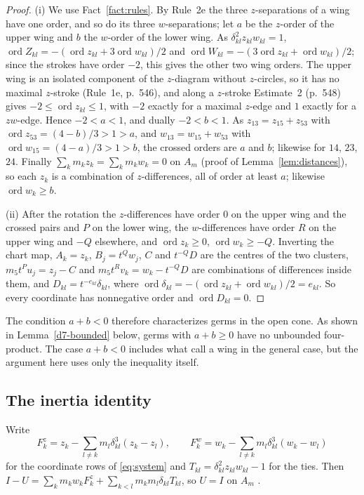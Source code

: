 \documentclass[11pt]{amsart}
\theoremstyle{definition}
\theoremstyle{remark}
\newcommand{\ord}{\operatorname{ord}}
\begin{document}
\begin{proof}
(i) We use Fact~\ref{fact:rules}.  By Rule~2e \cite[p.~552]{AK} the three $z$-separations of a
wing have one order, and so do its three $w$-separations; let $a$ be the $z$-order of the upper
wing and $b$ the $w$-order of the lower wing.  As $\delta_{kl}^2z_{kl}w_{kl}=1$,
$\ord Z_{kl}=-(\ord z_{kl}+3\ord w_{kl})/2$ and $\ord W_{kl}=-(3\ord z_{kl}+\ord w_{kl})/2$;
since the strokes have order $-2$, this gives the other two wing orders.  The upper wing is an
isolated component of the $z$-diagram without $z$-circles, so it has no maximal $z$-stroke
(Rule~1e, p.~546), and along a $z$-stroke Estimate~2 (p.~548) gives $-2\le\ord z_{kl}\le1$, with
$-2$ exactly for a maximal $z$-edge and $1$ exactly for a $zw$-edge.  Hence $-2<a<1$, and dually
$-2<b<1$.  As $z_{13}=z_{15}+z_{53}$
with $\ord z_{53}=(4-b)/3>1>a$, and $w_{13}=w_{15}+w_{53}$ with $\ord w_{15}=(4-a)/3>1>b$, the
crossed orders are $a$ and $b$; likewise for $14$, $23$, $24$.  Finally
$\sum_km_kz_k=\sum_km_kw_k=0$ on $A_m$ (proof of Lemma~\ref{lem:distances}), so each $z_k$ is a
combination of $z$-differences, all of order at least $a$; likewise $\ord w_k\ge b$.

(ii) After the rotation the $z$-differences have order $0$ on the upper wing and the crossed
pairs and $P$ on the lower wing, the $w$-differences have order $R$ on the upper wing and $-Q$
elsewhere, and $\ord z_k\ge0$, $\ord w_k\ge-Q$.  Inverting the chart map, $A_k=z_k$,
$B_j=t^Qw_j$, $C$ and $t^{-Q}D$ are the centres of the two clusters, $m_5t^Pu_j=z_j-C$ and
$m_5t^Rv_k=w_k-t^{-Q}D$ are combinations of differences inside them, and
$D_{kl}=t^{-e_{kl}}\delta_{kl}$, where $\ord\delta_{kl}=-(\ord z_{kl}+\ord w_{kl})/2=e_{kl}$.  So
every coordinate has nonnegative order and $\ord D_{kl}=0$.
\end{proof}

The condition $a+b<0$ therefore characterizes germs in the open cone.
As shown in Lemma~\ref{d7-bounded} below, germs with $a+b\ge0$ have no unbounded
four-product.  The case $a+b<0$ includes what \cite[\S8.7]{AK} call a wing in the
general case, but the argument here uses only the inequality itself.

\subsection{The inertia identity}
Write
\[
  F^z_k=z_k-\sum_{l\ne k}m_l\delta_{kl}^3(z_k-z_l),\qquad
  F^w_k=w_k-\sum_{l\ne k}m_l\delta_{kl}^3(w_k-w_l)
\]
for the coordinate rows of \eqref{eq:system} and $T_{kl}=\delta_{kl}^2z_{kl}w_{kl}-1$ for the
ties.  Then $I-U=\sum_km_kw_kF^z_k+\sum_{k<l}m_km_l\delta_{kl}T_{kl}$, so $U=I$ on $A_m$
\cite[p.~541]{AK}.
\end{document}
